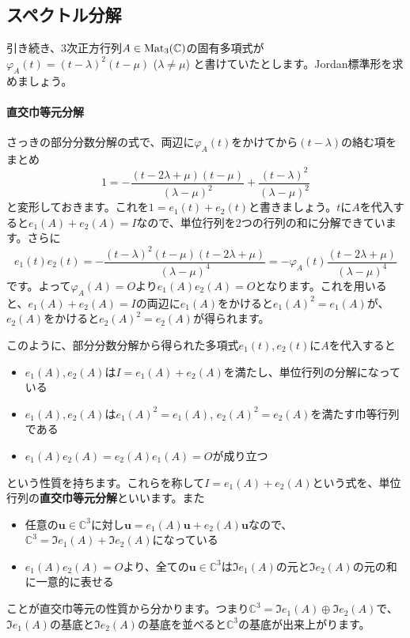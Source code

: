 \subsection{スペクトル分解}

引き続き、$3$次正方行列$A \in \operatorname{Mat}_3(\mathbb{C})$の固有多項式が$\varphi_A(t) = (t - \lambda)^2 (t - \mu)$ ($\lambda \neq \mu$) と書けていたとします。Jordan標準形を求めましょう。

\paragraph{直交巾等元分解}

さっきの部分分数分解の式で、両辺に$\varphi_A(t)$をかけてから$(t - \lambda)$の絡む項をまとめ
\[
1 = - \frac{(t - 2\lambda + \mu)(t - \mu)}{(\lambda - \mu)^2} + \frac{(t - \lambda)^2}{(\lambda - \mu)^2}
\]
と変形しておきます。これを$1 = e_1(t) + e_2(t)$と書きましょう。$t$に$A$を代入すると$e_1(A) + e_2(A) = I$なので、単位行列を$2$つの行列の和に分解できています。さらに
\[
e_1(t) e_2(t) = -\frac{(t - \lambda)^2 (t - \mu) (t - 2\lambda + \mu)}{(\lambda - \mu)^4} = -\varphi_A(t)\frac{(t - 2\lambda + \mu)}{(\lambda - \mu)^4}
\]
です。よって$\varphi_A(A) = O$より$e_1(A)e_2(A) = O$となります。これを用いると、$e_1(A) + e_2(A) = I$の両辺に$e_1(A)$をかけると$e_1(A)^2 = e_1(A)$が、$e_2(A)$をかけると$e_2(A)^2 = e_2(A)$が得られます。

このように、部分分数分解から得られた多項式$e_1(t), e_2(t)$に$A$を代入すると
\begin{itemize}
\item $e_1(A), e_2(A)$は$I = e_1(A) + e_2(A)$を満たし、単位行列の分解になっている
\item $e_1(A), e_2(A)$は$e_1(A)^2 = e_1(A)$, $e_2(A)^2 = e_2(A)$を満たす巾等行列である
\item $e_1(A) e_2(A) = e_2(A) e_1(A) = O$が成り立つ
\end{itemize}
という性質を持ちます。これらを称して$I = e_1(A) + e_2(A)$という式を、単位行列の\textbf{直交巾等元分解}といいます。また
\begin{itemize}
\item 任意の$\bm{u} \in \mathbb{C}^3$に対し$\bm{u} = e_1(A)\bm{u} + e_2(A) \bm{u}$なので、$\mathbb{C}^3 = \Im e_1(A) + \Im e_2(A)$になっている
\item $e_1(A) e_2(A) = O$より、全ての$\bm{u} \in \mathbb{C}^3$は$\Im e_1(A)$の元と$\Im e_2(A)$の元の和に一意的に表せる
\end{itemize}
ことが直交巾等元の性質から分かります。つまり$\mathbb{C}^3 = \Im e_1(A) \oplus \Im e_2(A)$で、$\Im e_1(A)$の基底と$\Im e_2(A)$の基底を並べると$\mathbb{C}^3$の基底が出来上がります。

